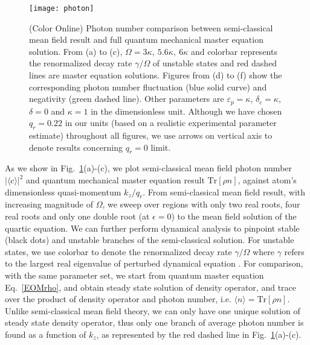 \documentclass[atoms,article,submit,moreauthors,pdftex,12pt,a4paper]{mdpi}
\begin{document}
\begin{figure}[htp]
\texttt{[image: photon]}
\caption{ (Color Online) Photon number comparison between semi-classical mean field result and full quantum mechanical master equation solution. From (a) to (c), $\Omega = 3\kappa,\ 5.6\kappa,\ 6\kappa$ and colorbar represents the renormalized decay rate $\gamma/\Omega$ of unstable states and red dashed lines are master equation solutions. Figures from (d) to (f) show the corresponding photon number fluctuation (blue solid curve) and negativity (green dashed line). Other parameters are $\varepsilon_p=\kappa$, $\delta_c=\kappa$, $\delta=0$ and $\kappa=1$ in the dimensionless unit. Although we have chosen $q_r=0.22$ in our units (based on a realistic experimental parameter estimate) throughout all figures, we use arrows on vertical axis to denote results concerning $q_r=0$ limit. 
}
\label{photon}
\end{figure}

As we show in Fig.~\ref{photon}(a)-(c), we plot semi-classical mean field  photon number $|\langle c\rangle|^2$ and quantum mechanical master equation result $\text{Tr}[\rho n]$, against atom's dimensionless quasi-momentum $k_z/q_r$. From semi-classical mean field result, with increasing magnitude of $\Omega$, we sweep over regions with only two real roots, four real roots and only one double root (at $\epsilon=0$) to the mean field solution of the quartic equation. We can further perform dynamical analysis \cite{cavitySOC} to pinpoint stable (black dots) and unstable branches of the semi-classical solution. For unstable states, we use colorbar to denote the renormalized decay rate $\gamma/\Omega$ where $\gamma$ refers to the largest real eigenvalue of perturbed dynamical equation \cite{cavitySOC}. 
For comparison, with the same parameter set, we start from quantum master equation Eq.~\ref{EOMrho}, and obtain steady state solution of density operator, and trace over the product of density operator and photon number, i.e. $\langle n\rangle=\text{Tr}[\rho n]$. Unlike semi-classical mean field theory, we can only have one unique solution of steady state density operator, thus only one branch of average photon number is found as a function of $k_z$, as represented by the red dashed line in  Fig.~\ref{photon}(a)-(c).
\end{document}
